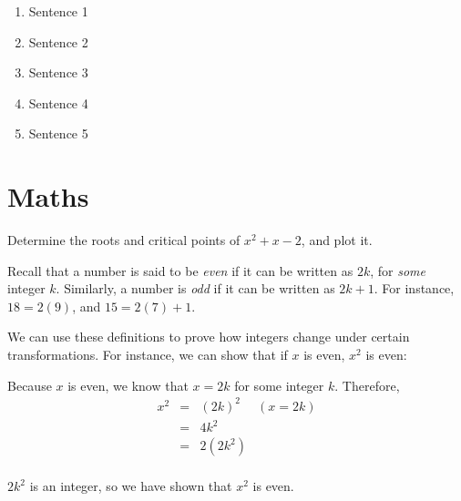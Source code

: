 \documentclass[11pt]{exam}
\def\QED{\ensuremath{{\square}}}
\def\markatright#1{\leavevmode\unskip\nobreak\quad\hspace*{\fill}{#1}}
\newenvironment{proof}
  {\begin{trivlist}\item[\hskip\labelsep{\bf Proof.}]}
  {\markatright{\QED}\end{trivlist}}
\begin{document}
\begin{questions}
\begin{enumerate}
\begin{enumerate}
\item Sentence 1
\item Sentence 2
\item Sentence 3
\item Sentence 4
\item Sentence 5
\end{enumerate}

\end{enumerate}

\newpage
\section{Maths}
\setcounter{question}{0}

\question[6] Determine the roots and critical points of $x^2 + x - 2$, and plot
it.
\vfill




\newpage
\question Recall that a number is said to be \emph{even} if it can be written
as $2k$, for \emph{some} integer $k$. Similarly, a number is \emph{odd} if it
can be written as $2k + 1$. For instance, $18 = 2(9)$, and $15 = 2(7) + 1$.

We can use these definitions to prove how integers change under certain
transformations. For instance, we can show that if $x$ is even, $x^2$ is even:

\begin{proof}
Because $x$ is even, we know that $x = 2k$ for some integer $k$. Therefore,
\[\begin{array}{rclr}
x^2 &=& (2k)^2 & (x = 2k) \\
&=& 4k^2 & \\
&=& 2(2k^2) & \\
\end{array}\]

$2k^2$ is an integer, so we have shown that $x^2$ is even.
\end{proof}


\end{questions}
\end{document}

